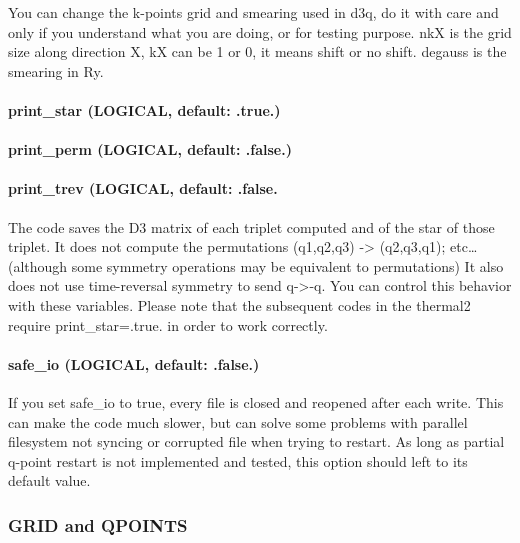 \documentclass[
]{article}
\begin{document}
You can change the k-points grid and smearing used in d3q, do it with
care and only if you understand what you are doing, or for testing
purpose. nkX is the grid size along direction X, kX can be 1 or 0, it
means shift or no shift. degauss is the smearing in Ry.

\hypertarget{print_star-logical-default-.true.}{%
\paragraph{print\_star (LOGICAL, default:
.true.)}\label{print_star-logical-default-.true.}}

\hypertarget{print_perm-logical-default-.false.}{%
\paragraph{print\_perm (LOGICAL, default:
.false.)}\label{print_perm-logical-default-.false.}}

\hypertarget{print_trev-logical-default-.false.}{%
\paragraph{print\_trev (LOGICAL, default:
.false.}\label{print_trev-logical-default-.false.}}

The code saves the D3 matrix of each triplet computed and of the star of
those triplet. It does not compute the permutations (q1,q2,q3)
-\textgreater{} (q2,q3,q1); etc\ldots{} (although some symmetry
operations may be equivalent to permutations) It also does not use
time-reversal symmetry to send q-\textgreater-q. You can control this
behavior with these variables. Please note that the subsequent codes in
the thermal2 require print\_star=.true. in order to work correctly.

\hypertarget{safe_io-logical-default-.false.}{%
\paragraph{safe\_io (LOGICAL, default:
.false.)}\label{safe_io-logical-default-.false.}}

If you set safe\_io to true, every file is closed and reopened after
each write. This can make the code much slower, but can solve some
problems with parallel filesystem not syncing or corrupted file when
trying to restart. As long as partial q-point restart is not implemented
and tested, this option should left to its default value.

\hypertarget{grid-and-qpoints}{%
\subsubsection{GRID and QPOINTS}\label{grid-and-qpoints}}
\end{document}
